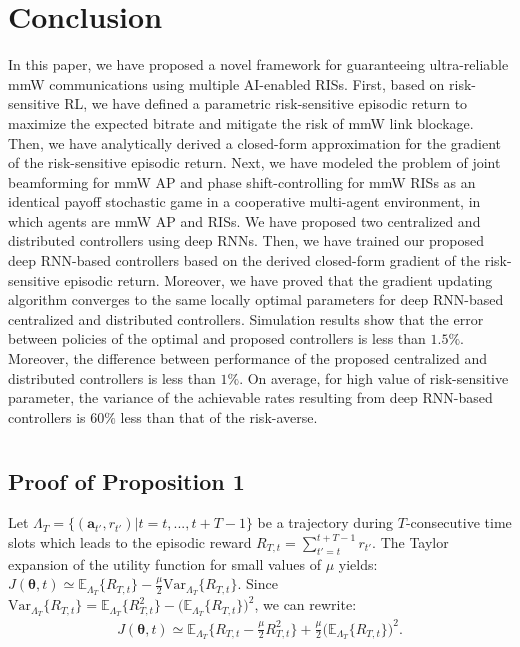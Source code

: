 \documentclass[conference]{IEEEtran}
\begin{document}
\section{Conclusion}\label{Sec:Conclusion}
In this paper, we have proposed a novel framework for guaranteeing ultra-reliable mmW communications using multiple AI-enabled RISs. First, based on risk-sensitive RL, we have defined a parametric risk-sensitive episodic return to maximize the expected bitrate and mitigate the risk of  mmW link blockage. Then, we have analytically derived a closed-form approximation for the gradient of the risk-sensitive episodic return. Next, we have modeled the problem of joint beamforming for mmW AP and phase shift-controlling for mmW RISs as an identical payoff stochastic game in a cooperative multi-agent environment, in which agents are mmW AP and RISs. We have proposed two centralized and distributed controllers using deep RNNs. Then, we have trained our proposed deep RNN-based controllers based on the derived closed-form gradient of the risk-sensitive episodic return. Moreover, we have proved that the gradient updating algorithm converges to the same locally optimal parameters for deep RNN-based centralized and distributed controllers. Simulation results show that the error between policies of the optimal and proposed controllers is less than $1.5\%$. Moreover, the difference between performance of the proposed centralized and distributed controllers is less than $1\%$. On average, for high value of risk-sensitive parameter, the variance of the achievable rates resulting from deep RNN-based controllers is $60\%$ less than that of the risk-averse.
\vspace{-0.3cm}
\appendix
\section{}
\subsection{Proof of Proposition 1}
Let $\Lambda_{T}=\{(\boldsymbol{a}_{t'},r_{t'})|t=t,...,t+T-1\}$ be a trajectory during $T$-consecutive time slots which leads to the episodic reward $R_{T,t}=\sum_{t'=t}^{t+T-1}r_{t'}$. The Taylor expansion of the utility function for small values of $\mu$ yields: $J(\boldsymbol{\theta},t)\simeq \mathbb{E}_{\Lambda_{T}}\{R_{T,t}\}-\frac{\mu}{2}\text{Var}_{\Lambda_{T}}\{R_{T,t}\}$. Since $\text{Var}_{\Lambda_{T}}\{R_{T,t}\}=\mathbb{E}_{\Lambda_{T}}\{R_{T,t}^2\}-\big(\mathbb{E}_{\Lambda_{T}}\{R_{T,t}\}\big)^2$, we can rewrite:
\begin{align}
J(\boldsymbol{\theta},t)\simeq
 \mathbb{E}_{\Lambda_{T}}\{R_{T,t}-\frac{\mu}{2}R_{T,t}^2\}+
\frac{\mu}{2} \big(\mathbb{E}_{\Lambda_{T}}\{R_{T,t}\}\big)^2.
\end{align}
\end{document}
